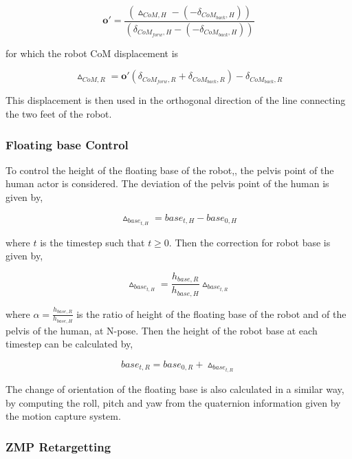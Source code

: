  \begin{equation}
     \mathbf{o'} = \frac{(\vartriangle_{CoM, H} - (-\delta_{CoM_{back}, H}))}{(\delta_{CoM_{forw}, H} - (-\delta_{CoM_{back}, H}))}
 \end{equation}

 for which the robot CoM displacement is

 \begin{equation}
     \vartriangle_{CoM, R} = \mathbf{o'}(\delta_{CoM_{forw}, R} + \delta_{CoM_{back}, R}) - \delta_{CoM_{back}, R}
 \end{equation}

This displacement is then used in the orthogonal direction of the line connecting the two feet of the robot.

\subsubsection{Floating base Control}

To control the height of the floating base of the robot,, the pelvis point of the human actor is considered. The deviation of the pelvis point of the human is given by,

\begin{equation}
    \vartriangle_{base_{t, H}} = base_{t,H} - base_{0, H} 
\end{equation}

where $t$ is the timestep such that $t \geq 0$. Then the correction for robot base is given by,

\begin{equation}
    \vartriangle_{base_{t, H}} = \frac{h_{base, R}}{h_{base, H}} \vartriangle_{base_{t, R}}
\end{equation}


where $\alpha =  \frac{h_{base, R}}{h_{base, H}} $ is the ratio of height of the floating base of the robot and of the pelvis of the human,
at N-pose. Then the height of the robot base at each timestep can be calculated by,


\begin{equation}
    base_{t, R} = base_{0,R} + \vartriangle_{base_{t, R}}
\end{equation}


The change of orientation of the floating base is also calculated in a similar way, by computing the roll, pitch and yaw from the quaternion information given by the motion capture system.

\subsubsection{ZMP Retargetting}


